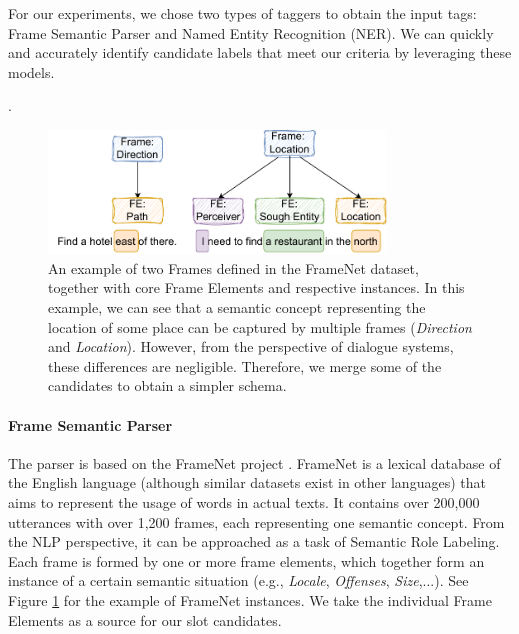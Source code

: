For our experiments, we chose two types of taggers to obtain the input tags: Frame Semantic Parser and Named Entity Recognition (NER).
We can quickly and accurately identify candidate labels that meet our criteria by leveraging these models.


.
\begin{figure}[h!]
\centering
    \includegraphics[width=0.8\textwidth]{images/framenet.pdf}
    \caption{An example of two Frames defined in the FrameNet dataset, together with core Frame Elements and respective instances. In this example, we can see that a semantic concept representing the location of some place can be captured by multiple frames (\emph{Direction} and \emph{Location}). However, from the perspective of dialogue systems, these differences are negligible. Therefore, we merge some of the candidates to obtain a simpler schema.}
    \label{fig:framenet}
\end{figure}

\paragraph{Frame Semantic Parser} The parser is based on the FrameNet project \cite{baker1998berkeley}.
FrameNet is a lexical database of the English language (although similar datasets exist in other languages) that aims to represent the usage of words in actual texts.
It contains over 200,000 utterances with over 1,200 frames, each representing one semantic concept.
From the NLP perspective, it can be approached as a task of Semantic Role Labeling.
Each frame is formed by one or more frame elements, which together form an instance of a certain semantic situation (e.g., \emph{Locale}, \emph{Offenses}, \emph{Size},...).
See Figure \ref{fig:framenet} for the example of FrameNet instances.
We take the individual Frame Elements as a source for our slot candidates.

